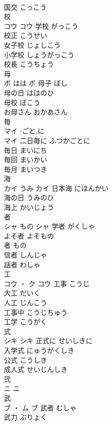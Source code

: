 \documentclass[8pt]{extreport}
\begin{document}
\begin{CJK}{UTF8}{min}
\\	国交	こっこう	
\\	校	
\\	コウ		コウ	学校	がっこう	
\\	校正	こうせい	
\\	女子校	じょしこう	
\\	小学校	しょうがっこう	
\\	校長	こうちょう	
\\	母	
\\	ボ	はは	ボ	母子	ぼし	
\\	母の日	ははのひ	
\\	母校	ぼこう	
\\	お母さん	おかあさん	
\\	毎	
\\	マイ	-ごと.に
\\	マイ	二日毎に	ふつかごとに	
\\	毎日	まいにち	
\\	毎回	まいかい	
\\	毎月	まいつき	
\\	海	
\\	カイ	うみ	カイ	日本海	にほんかい	
\\	海の日	うみのひ	
\\	海上	かいじょう	
\\	者	
\\	シャ	もの	シャ	学者	がくしゃ	
\\	よそ者	よそもの	
\\	者	もの	
\\	信者	しんじゃ	
\\	話者	わしゃ	
\\	工	
\\	コウ ・ ク		コウ	工事	こうじ	
\\	大工	だいく	
\\	人工	じんこう	
\\	工事中	こうじちゅう	
\\	工学	こうがく	
\\	式	
\\	シキ		シキ	正式に	せいしきに	
\\	入学式	にゅうがくしき	
\\	公式	こうしき	
\\	成人式	せいじんしき	
\\	弐	
\\	ニ		ニ																																			
\\	武	
\\	ブ ・ ム		ブ	武者	むしゃ	
\\	武力	ぶりょく	

\end{CJK}
\end{document}
